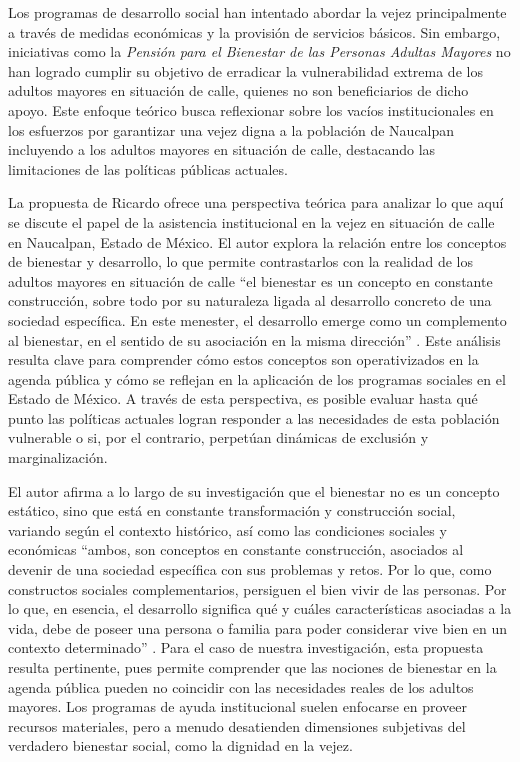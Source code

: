 \documentclass[
  spanish,
  11pt,
  a4paper,
]{scrbook}
\begin{document}
Los programas de desarrollo social han intentado abordar la vejez
principalmente a través de medidas económicas y la provisión de
servicios básicos. Sin embargo, iniciativas como la \emph{Pensión para
el Bienestar de las Personas Adultas Mayores} no han logrado cumplir su
objetivo de erradicar la vulnerabilidad extrema de los adultos mayores
en situación de calle, quienes no son beneficiarios de dicho apoyo. Este
enfoque teórico busca reflexionar sobre los vacíos institucionales en
los esfuerzos por garantizar una vejez digna a la población de Naucalpan
incluyendo a los adultos mayores en situación de calle, destacando las
limitaciones de las políticas públicas actuales.

La propuesta de Ricardo \textcite{Lopez2019} ofrece una perspectiva
teórica para analizar lo que aquí se discute el papel de la asistencia
institucional en la vejez en situación de calle en Naucalpan, Estado de
México. El autor explora la relación entre los conceptos de bienestar y
desarrollo, lo que permite contrastarlos con la realidad de los adultos
mayores en situación de calle ``el bienestar es un concepto en constante
construcción, sobre todo por su naturaleza ligada al desarrollo concreto
de una sociedad específica. En este menester, el desarrollo emerge como
un complemento al bienestar, en el sentido de su asociación en la misma
dirección'' \autocite[289]{Lopez2019}. Este análisis resulta clave para
comprender cómo estos conceptos son operativizados en la agenda pública
y cómo se reflejan en la aplicación de los programas sociales en el
Estado de México. A través de esta perspectiva, es posible evaluar hasta
qué punto las políticas actuales logran responder a las necesidades de
esta población vulnerable o si, por el contrario, perpetúan dinámicas de
exclusión y marginalización.

El autor afirma a lo largo de su investigación que el bienestar no es un
concepto estático, sino que está en constante transformación y
construcción social, variando según el contexto histórico, así como las
condiciones sociales y económicas ``ambos, son conceptos en constante
construcción, asociados al devenir de una sociedad específica con sus
problemas y retos. Por lo que, como constructos sociales
complementarios, persiguen el bien vivir de las personas. Por lo que, en
esencia, el desarrollo significa qué y cuáles características asociadas
a la vida, debe de poseer una persona o familia para poder considerar
vive bien en un contexto determinado'' \autocite[288]{Lopez2019}. Para
el caso de nuestra investigación, esta propuesta resulta pertinente,
pues permite comprender que las nociones de bienestar en la agenda
pública pueden no coincidir con las necesidades reales de los adultos
mayores. Los programas de ayuda institucional suelen enfocarse en
proveer recursos materiales, pero a menudo desatienden dimensiones
subjetivas del verdadero bienestar social, como la dignidad en la vejez.
\end{document}
